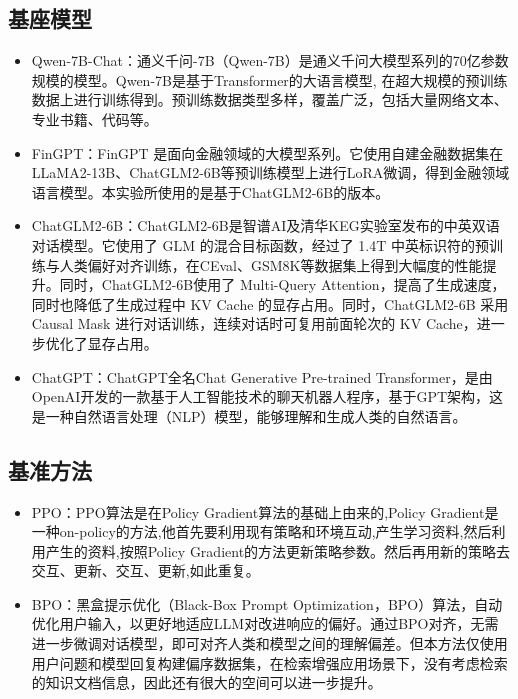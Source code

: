 \subsection{基座模型}

\begin{itemize}[topsep = 0 pt, itemsep= 0 pt, parsep=0pt, partopsep=0pt, leftmargin=36pt, itemindent=0pt, labelsep=6pt, listparindent=24pt]
	\item Qwen-7B-Chat\cite{DBLP:journals/corr/abs-2309-16609}：通义千问-7B（Qwen-7B）是通义千问大模型系列的70亿参数规模的模型。Qwen-7B是基于Transformer的大语言模型, 在超大规模的预训练数据上进行训练得到。预训练数据类型多样，覆盖广泛，包括大量网络文本、专业书籍、代码等。
	\item FinGPT\cite{yang2023fingpt}：FinGPT 是面向金融领域的大模型系列。它使用自建金融数据集在LLaMA2-13B\cite{DBLP:journals/corr/abs-2307-09288}、ChatGLM2-6B等预训练模型上进行LoRA微调，得到金融领域语言模型。本实验所使用的是基于ChatGLM2-6B的版本。
	\item ChatGLM2-6B\cite{DBLP:conf/iclr/ZengLDWL0YXZXTM23}：ChatGLM2-6B是智谱AI及清华KEG实验室发布的中英双语对话模型。它使用了 GLM 的混合目标函数，经过了 1.4T 中英标识符的预训练与人类偏好对齐训练，在CEval、GSM8K等数据集上得到大幅度的性能提升。同时，ChatGLM2-6B使用了 Multi-Query Attention，提高了生成速度，同时也降低了生成过程中 KV Cache 的显存占用。同时，ChatGLM2-6B 采用 Causal Mask 进行对话训练，连续对话时可复用前面轮次的 KV Cache，进一步优化了显存占用。
	\item ChatGPT\cite{DBLP:conf/nips/Ouyang0JAWMZASR22}：ChatGPT全名Chat Generative Pre-trained Transformer，是由OpenAI开发的一款基于人工智能技术的聊天机器人程序，基于GPT\cite{radford2018improving}架构，这是一种自然语言处理（NLP）模型，能够理解和生成人类的自然语言。
\end{itemize}

\subsection{基准方法}

\begin{itemize}[topsep = 0 pt, itemsep= 0 pt, parsep=0pt, partopsep=0pt, leftmargin=36pt, itemindent=0pt, labelsep=6pt, listparindent=24pt]
	\item PPO\cite{DBLP:journals/corr/SchulmanWDRK17}：PPO算法是在Policy Gradient算法的基础上由来的,Policy Gradient是一种on-policy的方法,他首先要利用现有策略和环境互动,产生学习资料,然后利用产生的资料,按照Policy Gradient的方法更新策略参数。然后再用新的策略去交互、更新、交互、更新,如此重复。
	\item BPO\cite{DBLP:journals/corr/abs-2311-04155}：黑盒提示优化（Black-Box Prompt Optimization，BPO）算法，自动优化用户输入，以更好地适应LLM对改进响应的偏好。通过BPO对齐，无需进一步微调对话模型，即可对齐人类和模型之间的理解偏差。但本方法仅使用用户问题和模型回复构建偏序数据集，在检索增强应用场景下，没有考虑检索的知识文档信息，因此还有很大的空间可以进一步提升。
\end{itemize}

